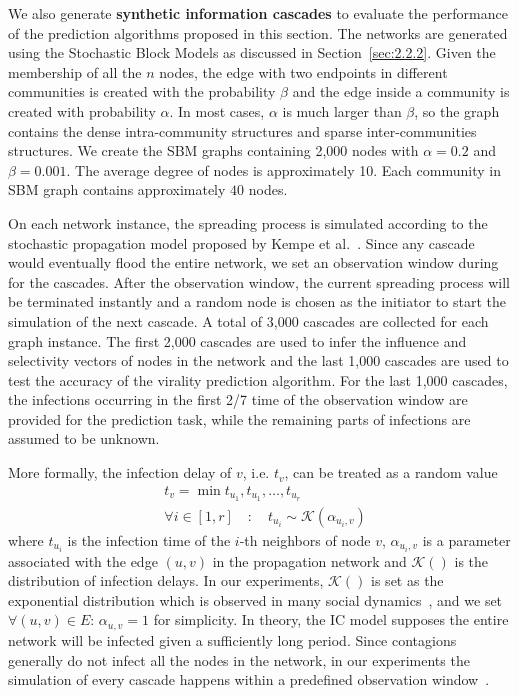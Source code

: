 We also generate \textbf{synthetic information cascades} to evaluate the performance of the prediction algorithms proposed in this section. The networks are generated using the Stochastic Block Models as discussed in Section~\ref{sec:2.2.2}. Given the membership of all the $n$ nodes, the edge with two endpoints in different communities is created with the probability $\beta$ and the edge inside a community is created with probability $\alpha$. In most cases, $\alpha$ is much larger than $\beta$, so the graph contains the dense intra-community structures and sparse  inter-communities structures. We create the SBM graphs containing 2,000 nodes with $\alpha=0.2$ and $\beta=0.001$. The average degree of nodes is approximately 10. Each community in SBM graph contains approximately $40$ nodes.

On each network instance, the spreading process is simulated according to the stochastic propagation model proposed by Kempe et al.~\cite{kempe2003maximizing}. Since any cascade would eventually flood the entire network, we set an observation window during for the cascades. After the observation window, the current spreading process will be terminated instantly and a random node is chosen as the initiator to start the simulation of the next cascade. A total of 3,000 cascades are collected for each graph instance. The first 2,000 cascades are used to infer the influence and selectivity vectors of nodes in the network and the last 1,000 cascades are used to test the accuracy of the virality prediction algorithm. For the last 1,000 cascades, the infections occurring in the first 2/7 time of the observation window are provided for the prediction task, while the remaining parts of infections are assumed to be unknown.

More formally, the infection delay of $v$, i.e. $t_v$, can be treated as a random value
\begin{equation}
\begin{array}{rcl}
   &t_v = \min{t_{u_1}, t_{u_1},\dots,t_{u_r}} \\
   &\forall i \in [1,r] \quad : \quad t_{u_i} \sim \mathcal{K}(\alpha_{u_i,v})
\end{array}
\end{equation}
where $t_{u_i}$ is the infection time of the $i$-th neighbors of node $v$, $\alpha_{u_i,v}$ is a parameter associated with the edge $(u,v)$ in the propagation network and $\mathcal{K}()$ is the distribution of infection delays. In our experiments, $\mathcal{K}()$ is set as the exponential distribution which is observed in many social dynamics~\cite{barabasi2005origin}, and we set $\forall (u,v)\in E$: $\alpha_{u,v}=1$ for simplicity. In theory, the IC model supposes the entire network will be infected given a sufficiently long period. Since contagions generally do not infect all the nodes in the network, in our experiments the simulation of every cascade happens within a predefined observation window~\cite{gomez2013structure}.

